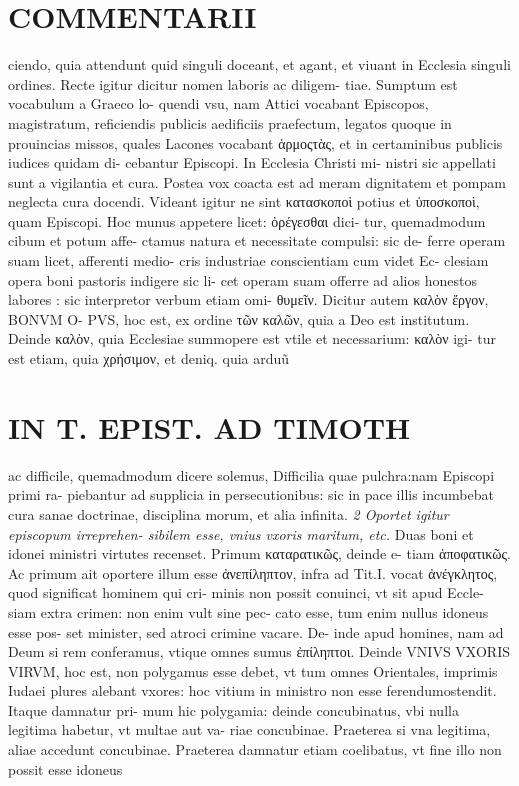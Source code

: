 \documentclass{article}
\begin{document}
\begin{pages}
\section*{COMMENTARII }\pstart ciendo, quia attendunt quid singuli doceant, et agant, et viuant in Ecclesia singuli ordines. Recte igitur dicitur nomen laboris ac diligem- tiae. Sumptum est vocabulum a Graeco lo- quendi vsu, nam Attici vocabant Episcopos, magistratum, reficiendis publicis aedificiis praefectum, legatos quoque in prouincias missos, quales Lacones vocabant ἁρμοςτὰς, et in certaminibus publicis iudices quidam di- cebantur Episcopi. In Ecclesia Christi mi- nistri sic appellati sunt a vigilantia et cura. Postea vox coacta est ad meram dignitatem et pompam neglecta cura docendi. Videant igitur ne sint κατασκοποὶ potius et ὑποσκοποὶ, quam Episcopi.  \pend\pstart Hoc munus appetere licet: ὀρέγεσθαι dici- tur, quemadmodum cibum et potum affe- ctamus natura et necessitate compulsi: sic de- ferre operam suam licet, afferenti medio- cris industriae conscientiam cum videt Ec- clesiam opera boni pastoris indigere sic li- cet operam suam offerre ad alios honestos labores : sic interpretor verbum etiam omi- θυμεῖν.  \pend\pstart Dicitur autem καλὸν ἔργον, BONVM O- PVS, hoc est, ex ordine τῶν καλῶν, quia a Deo est institutum. Deinde καλὸν, quia Ecclesiae summopere est vtile et necessarium: καλὸν igi- tur est etiam, quia χρήσιμον, et deniq. quia arduũ  \pend
\section*{IN T. EPIST. AD TIMOTH }
\marginpar{[ p.63 ]}\pstart ac difficile, quemadmodum dicere solemus, Difficilia quae pulchra:nam Episcopi primi ra- piebantur ad supplicia in persecutionibus: sic in pace illis incumbebat cura sanae doctrinae, disciplina morum, et alia infinita.  \pend
\textit{2 Oportet igitur episcopum irreprehen- sibilem esse, vnius vxoris maritum, etc. }\pstart Duas boni et idonei ministri virtutes recenset. Primum καταρατικῶς, deinde e- tiam ἀποφατικῶς. Ac primum ait oportere illum esse ἀνεπίληπτον, infra ad Tit.I. vocat ἀνέγκλητος, quod significat hominem qui cri- minis non possit conuinci, vt sit apud Eccle- siam extra crimen: non enim vult sine pec- cato esse, tum enim nullus idoneus esse pos- set minister, sed atroci crimine vacare. De- inde apud homines, nam ad Deum si rem conferamus, vtique omnes sumus ἐπίληπτοι. Deinde VNIVS VXORIS VIRVM, hoc est, non polygamus esse debet, vt tum omnes Orientales, imprimis Iudaei plures alebant vxores: hoc vitium in ministro non esse ferendumostendit. Itaque damnatur pri- mum hic polygamia: deinde concubinatus, vbi nulla legitima habetur, vt multae aut va- riae concubinae. Praeterea si vna legitima, aliae accedunt concubinae. Praeterea damnatur etiam coelibatus, vt fine illo non possit esse idoneus  \pend
\marginpar{[ p.64 ]}

\end{pages}
\end{document}
